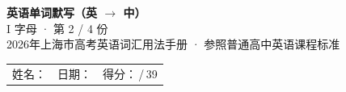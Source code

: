 \documentclass[10pt,a4paper]{article}
\begin{document}
\pagestyle{plain}

\begin{center}
{\LARGE\bfseries 英语单词默写（英 $\to$ 中）}\\[0.22em]
{\large I 字母 · 第 2 / 4 份}\\[0.18em]
{\small 2026年上海市高考英语词汇用法手册 · 参照普通高中英语课程标准}
\end{center}

\vspace{0.25em}
\noindent\begin{tabular}{@{}p{}@{}p{}@{}p{}@{}}
姓名：\underline{\hspace{2.0cm}} & 日期：\underline{\hspace{2.0cm}} & 得分：\underline{\hspace{1.3cm}}\,/\,39 \\
\end{tabular}

\vspace{0.3em}

\vspace{0.08em}
\end{document}
